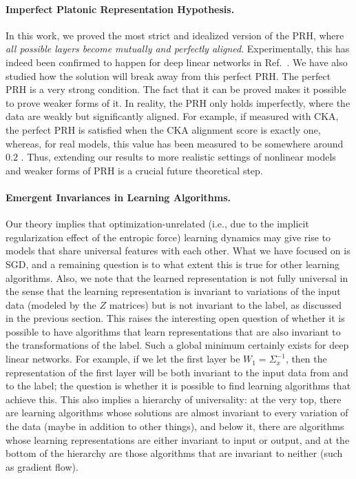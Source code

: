 \documentclass[11pt]{article}
\theoremstyle{plain}
\begin{document}
\paragraph{Imperfect Platonic Representation Hypothesis.} In this work, we proved the most strict and idealized version of the PRH, where \textit{all possible layers become mutually and perfectly aligned}. Experimentally, this has indeed been confirmed to happen for deep linear networks in Ref.~\cite{ziyin2025neural}. We have also studied how the solution will break away from this perfect PRH. The perfect PRH is a very strong condition. The fact that it can be proved makes it possible to prove weaker forms of it. In reality, the PRH only holds imperfectly, where the data are weakly but significantly aligned. For example, if measured with CKA, the perfect PRH is satisfied when the CKA alignment score is exactly one, whereas, for real models, this value has been measured to be somewhere around $0.2$ \cite{huh2024platonic}. Thus, extending our results to more realistic settings of nonlinear models and weaker forms of PRH is a crucial future theoretical step.



\vspace{-1mm}
\paragraph{Emergent Invariances in Learning Algorithms.} Our theory implies that optimization-unrelated (i.e., due to the implicit regularization effect of the entropic force) learning dynamics may give rise to models that share universal features with each other. What we have focused on is SGD, and a remaining question is to what extent this is true for other learning algorithms. Also, we note that the learned representation is not fully universal in the sense that the learning representation is invariant to variations of the input data (modeled by the $Z$ matrices) but is not invariant to the label, as discussed in the previous section. This raises the interesting open question of whether it is possible to have algorithms that learn representations that are also invariant to the transformations of the label. Such a global minimum certainly exists for deep linear networks. For example, if we let the first layer be $W_1= \Sigma_x^{-1}$, then the representation of the first layer will be both invariant to the input data from and to the label; the question is whether it is possible to find learning algorithms that achieve this. This also implies a hierarchy of universality: at the very top, there are learning algorithms whose solutions are almost invariant to every variation of the data (maybe in addition to other things), and below it, there are algorithms whose learning representations are either invariant to input or output, and at the bottom of the hierarchy are those algorithms that are invariant to neither (such as gradient flow).
\end{document}
